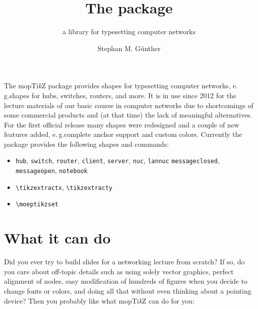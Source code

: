 \documentclass{scrartcl}
\title{The \moeptikz{} package}
\subtitle{a library for typesetting computer networks}
\author{Stephan M. G\"unther}
\newcommand*{\TikZ}{Ti\textit{k}Z\xspace}
\newcommand*{\moeptikz}{mo\reflectbox{e}p\TikZ}
\begin{document}
\maketitle

The \moeptikz{} package provides shapes for typesetting computer networks,
e.\,g.\@ shapes for hubs, switches, routers, and more.
It is in use since 2012 for the lecture materials of our basic course in
computer networks due to shortcomings of some commercial products and
(at that time) the lack of meaningful alternatives.
For the first official release many shapes were redesigned and a couple of new
features added, e.\,g.\@ complete anchor support and custom colors.
Currently the package provides the following shapes and commands:
\begin{itemize}\itemsep0pt
	\item \verb|hub|, \verb|switch|, \verb|router|, \verb|client|,
	\verb|server|, \verb|nuc|, \verb|lannuc| \verb|messageclosed|, \verb|messageopen|,
	\verb|notebook|
	\item \verb|\tikzextractx|, \verb|\tikzextracty|
	\item \verb|\moeptikzset|{}
\end{itemize}

\section{What it can do}
Did you ever try to build slides for a networking lecture from scratch?
If so, do you care about off-topic details such as using solely vector
graphics, perfect alignment of nodes, easy modification of hundreds of figures
when you decide to change fonts or colors, and doing all that without even
thinking about a pointing device?
Then you probably like what \moeptikz{} can do for you:
\end{document}
